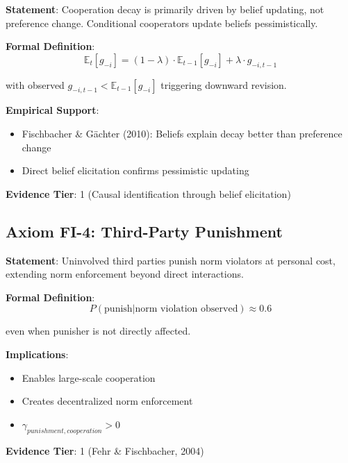 \begin{tcolorbox}[colback=blue!5!white,colframe=blue!75!black,title=Axiom FI-3: Belief-Driven Cooperation Decay]
\textbf{Statement}: Cooperation decay is primarily driven by belief updating, not preference change. Conditional cooperators update beliefs pessimistically.

\textbf{Formal Definition}:
\begin{equation}
\mathbb{E}_t[g_{-i}] = (1-\lambda) \cdot \mathbb{E}_{t-1}[g_{-i}] + \lambda \cdot g_{-i,t-1}
\end{equation}

with observed $g_{-i,t-1} < \mathbb{E}_{t-1}[g_{-i}]$ triggering downward revision.

\textbf{Empirical Support}:
\begin{itemize}
    \item Fischbacher \& Gächter (2010): Beliefs explain decay better than preference change
    \item Direct belief elicitation confirms pessimistic updating
\end{itemize}

\textbf{Evidence Tier}: 1 (Causal identification through belief elicitation)
\end{tcolorbox}

\subsection{Axiom FI-4: Third-Party Punishment}

\begin{tcolorbox}[colback=blue!5!white,colframe=blue!75!black,title=Axiom FI-4: Third-Party Punishment]
\textbf{Statement}: Uninvolved third parties punish norm violators at personal cost, extending norm enforcement beyond direct interactions.

\textbf{Formal Definition}:
\begin{equation}
P(\text{punish}|\text{norm violation observed}) \approx 0.6
\end{equation}

even when punisher is not directly affected.

\textbf{Implications}:
\begin{itemize}
    \item Enables large-scale cooperation
    \item Creates decentralized norm enforcement
    \item $\gamma_{punishment, cooperation} > 0$
\end{itemize}

\textbf{Evidence Tier}: 1 (Fehr \& Fischbacher, 2004)
\end{tcolorbox}

